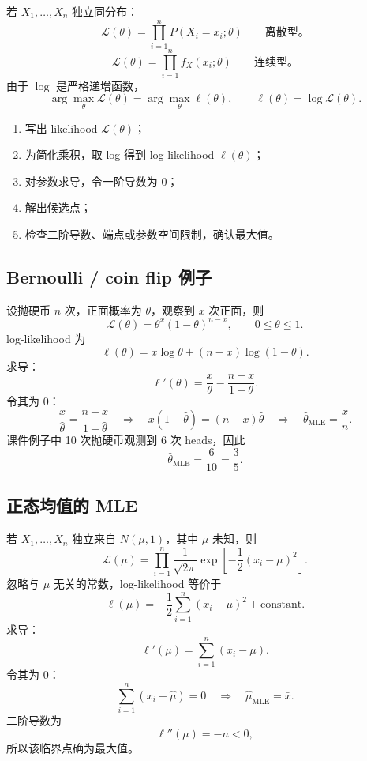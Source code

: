\documentclass[11pt,a4paper]{article}
\theoremstyle{definition}
\theoremstyle{plain}
\theoremstyle{remark}
\begin{document}
\begin{memorybox}
若 $X_1,\ldots,X_n$ 独立同分布：
\[
    \boxed{
    \mathcal L(\theta)
    =
    \prod_{i=1}^n P(X_i=x_i;\theta)
    }
    \qquad \text{离散型。}
\]
\[
    \boxed{
    \mathcal L(\theta)
    =
    \prod_{i=1}^n f_X(x_i;\theta)
    }
    \qquad \text{连续型。}
\]
由于 $\log$ 是严格递增函数，
\[
    \boxed{
    \arg\max_\theta \mathcal L(\theta)
    =
    \arg\max_\theta \ell(\theta),
    \qquad
    \ell(\theta)=\log\mathcal L(\theta).
    }
\]
\end{memorybox}

\begin{methodbox}
\begin{enumerate}
    \item 写出 likelihood $\mathcal L(\theta)$；
    \item 为简化乘积，取 log 得到 log-likelihood $\ell(\theta)$；
    \item 对参数求导，令一阶导数为 0；
    \item 解出候选点；
    \item 检查二阶导数、端点或参数空间限制，确认最大值。
\end{enumerate}
\end{methodbox}

\subsection{Bernoulli / coin flip 例子}

设抛硬币 $n$ 次，正面概率为 $\theta$，观察到 $x$ 次正面，则
\[
    \mathcal L(\theta)=\theta^x(1-\theta)^{n-x},\qquad 0\le \theta\le 1.
\]
log-likelihood 为
\[
    \ell(\theta)=x\log\theta+(n-x)\log(1-\theta).
\]
求导：
\[
    \ell'(\theta)=\frac{x}{\theta}-\frac{n-x}{1-\theta}.
\]
令其为 0：
\[
    \frac{x}{\hat\theta}=\frac{n-x}{1-\hat\theta}
    \quad\Longrightarrow\quad
    x(1-\hat\theta)=(n-x)\hat\theta
    \quad\Longrightarrow\quad
    \boxed{\hat\theta_{\mathrm{MLE}}=\frac{x}{n}.}
\]
课件例子中 10 次抛硬币观测到 6 次 heads，因此
\[
    \hat\theta_{\mathrm{MLE}}=\frac{6}{10}=\frac{3}{5}.
\]

\subsection{正态均值的 MLE}

若 $X_1,\ldots,X_n$ 独立来自 $N(\mu,1)$，其中 $\mu$ 未知，则
\[
    \mathcal L(\mu)
    =
    \prod_{i=1}^n\frac{1}{\sqrt{2\pi}}
    \exp\left[-\frac{1}{2}(x_i-\mu)^2\right].
\]
忽略与 $\mu$ 无关的常数，log-likelihood 等价于
\[
    \ell(\mu)=
    -\frac{1}{2}\sum_{i=1}^n(x_i-\mu)^2+\text{constant}.
\]
求导：
\[
    \ell'(\mu)=\sum_{i=1}^n(x_i-\mu).
\]
令其为 0：
\[
    \sum_{i=1}^n(x_i-\hat\mu)=0
    \quad\Longrightarrow\quad
    \boxed{\hat\mu_{\mathrm{MLE}}=\bar x.}
\]
二阶导数为
\[
    \ell''(\mu)=-n<0,
\]
所以该临界点确为最大值。
\end{document}
